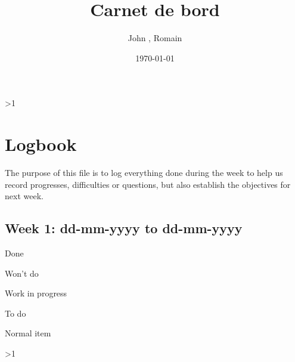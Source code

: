 \documentclass[a4paper]{article}  %
\title{Carnet de bord}
\author{John \famName{Doe}, Romain \famName{Noël}}
\date{\today}
\newcommand{\Pathbasebib}{\PathR/ref_RN.bib,\PathR/ref_XX.bib}%
\begin{document}

\ifnum\value{levelstanda}>1
	{}%
\else
	\maketitle
\fi


\section{Logbook}
	The purpose of this file is to log everything done during the week to help us record progresses, difficulties or questions, but also establish the objectives for next week.


\subsection{Week 1: dd-mm-yyyy to dd-mm-yyyy}
	\begin{todolist}
		\item[\done] Done
		\item[\wontdo] Won't do
		\item[\wip] Work in progress
		\item[\todos] To do
		\item Normal item
	\end{todolist}


\ifnum\value{levelstanda}>1
	{}%
\else

	\printunsrtglossary[type=acronym]
	\printunsrtglossary[type=symbol]
\fi

\addtocounter{levelstanda}{-1}
\end{document}
